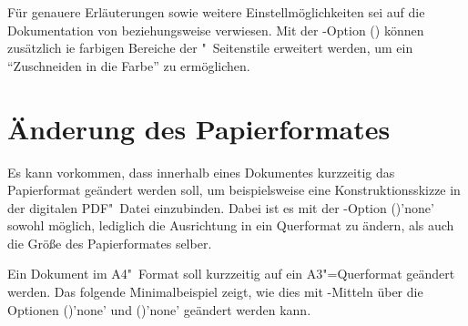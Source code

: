 %
Für genauere Erläuterungen sowie weitere Einstellmöglichkeiten sei auf die 
Dokumentation von  beziehungsweise  verwiesen.
Mit der \TUDScript-Option () können
zusätzlich ie farbigen Bereiche der "~Seitenstile 
erweitert werden, um ein \enquote{Zuschneiden in die Farbe} zu ermöglichen.



\section{Änderung des Papierformates}
%
%
Es kann vorkommen, dass innerhalb eines Dokumentes kurzzeitig das Papierformat 
geändert werden soll, um beispielsweise eine Konstruktionsskizze in der 
digitalen PDF"~Datei einzubinden. Dabei ist es mit der \KOMAScript-Option 
()'none' sowohl möglich, lediglich die 
Ausrichtung in ein Querformat zu ändern, als auch die Größe des Papierformates 
selber.
%
\begin{Example}
Ein Dokument im A4"~Format soll kurzzeitig auf ein A3"=Querformat geändert 
werden. Das folgende Minimalbeispiel zeigt, wie dies mit \KOMAScript-Mitteln 
über die Optionen ()'none' und 
()'none' geändert werden kann.
\end{Example}



